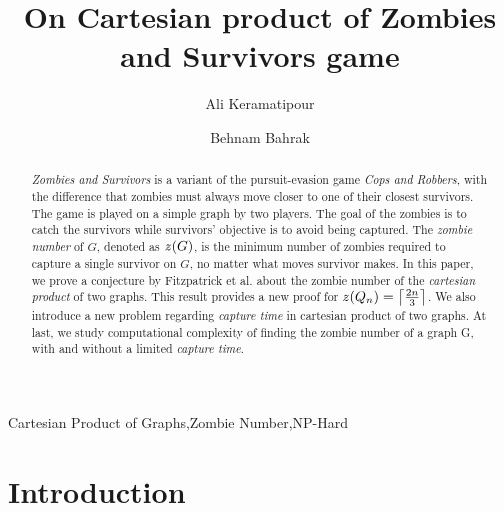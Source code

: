 \documentclass[1p]{elsarticle}
\DeclarePairedDelimiter\ceil{\lceil}{\rceil} \DeclarePairedDelimiter\floor{\lfloor}{\rfloor}
\newcommand{\zn}{\ooalign{$z$\cr\hfil\rule[.5ex]{.2em}{.08ex}\hfil\cr}}
\begin{document}
	
	\begin{frontmatter}
		
		\title{On Cartesian product of Zombies and Survivors game}
		
		
		\author{Ali Keramatipour}
		
		\author{Behnam Bahrak}
		
		\address{School of Electrical and Computer Engineering, College of Engineering, University of Tehran, Tehran, Iran}
		
		\begin{abstract}
		{\it Zombies and Survivors} is a variant of the pursuit-evasion game {\it Cops and Robbers}, with the difference
		that zombies must always move closer to one of their closest survivors. The game is played on a simple graph by
		two players. The goal of the zombies is to catch the survivors while survivors' objective is to avoid being
		captured. The {\it zombie number} of $G$, denoted as $\zn(G)$, is the minimum number of zombies required to
		capture a single survivor on $G$, no matter what moves survivor makes. In this paper, we prove a conjecture by
		Fitzpatrick et al.\cite{Fitz16} about the zombie number of the {\it cartesian product} of two graphs. This
		result provides a new proof for $\zn(Q_n) = \ceil*{\frac{2n}{3}}$. We also introduce a new problem regarding
		{\it capture time} in cartesian product of two graphs. At last, we study computational complexity of finding the
		zombie number of a graph G, with and without a limited {\it capture time}.
		\end{abstract}
		
		\begin{keyword}
			Cartesian Product of Graphs\sep Zombie Number\sep NP-Hard
		\end{keyword}
		
	\end{frontmatter}
	
\section{Introduction}\label{section-introduction}
\end{document}
